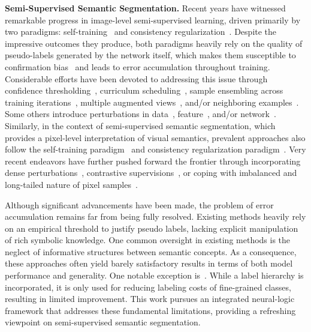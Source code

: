 \documentclass[10pt,twocolumn,letterpaper]{article}
\begin{document}
\noindent\textbf{Semi-Supervised Semantic Segmentation.}
Recent years have witnessed remarkable progress in image-level semi-supervised learning, driven primarily by two paradigms: self-training~\cite{nigam2000analyzing,grandvalet2005semi,lee2013pseudo} and consistency regularization~\cite{bachman2014learning,sajjadi2016regularization}.
Despite the impressive outcomes they produce, both paradigms heavily rely on the quality of pseudo-labels generated by the network itself, which makes them susceptible to confirmation bias~\cite{arazo2020pseudo} and leads to error accumulation throughout training.
Considerable efforts have been devoted to addressing this issue through confidence thresholding~\cite{berthelot2019remixmatch,sohn2020fixmatch,xie2020unsupervised,xie2020self}, curriculum scheduling~\cite{zhang2021flexmatch,xu2021dash}, sample ensembling across training iterations~\cite{laine2016temporal,tarvainen2017mean}, multiple augmented views~\cite{berthelot2019mixmatch}, and/or neighboring examples~\cite{iscen2019label,shi2018transductive,li2021comatch}. Some others introduce perturbations in data~\cite{xie2020unsupervised,sohn2020fixmatch,xie2020self}, feature~\cite{kuo2020featmatch}, and/or network~\cite{rasmus2015semi,sajjadi2016regularization}.
Similarly, in the context of semi-supervised semantic segmentation, which provides a pixel-level interpretation of visual semantics, prevalent approaches also follow the self-training paradigm~\cite{feng2022semi,yuan2021simple,yang2021st++,zhai2019s4l} and consistency regularization paradigm~\cite{french2020semi,ke2020guided,zou2020pseudoseg,ouali2020semi,kim2020structured,lai2021semi}. Very recent endeavors have further pushed forward the frontier through incorporating dense perturbations~\cite{yuan2022semi,yang2021st++,tu2022guidedmix,liu2022perturbed,zou2020pseudoseg}, contrastive supervisions~\cite{wang2022semi,liu2021bootstrapping,zhong2021pixel,zhou2021c3}, or coping with imbalanced and long-tailed nature of pixel samples~\cite{fan2022ucc,hu2021semi}.

Although significant advancements have been made, the problem of error accumulation remains far from being fully resolved. Existing methods heavily rely on an empirical threshold to justify pseudo labels, lacking explicit manipulation of rich symbolic knowledge. One common oversight in existing methods is the neglect of informative structures between semantic concepts.
As a consequence, these approaches often yield barely satisfactory results in terms of both model performance and generality.
One notable exception is~\cite{garg2022hiermatch}. While a label hierarchy is incorporated, it is only used for reducing labeling costs of fine-grained classes, resulting in limited improvement.
This work pursues an integrated neural-logic framework that addresses these fundamental limitations, providing a refreshing viewpoint on semi-supervised semantic segmentation.
\end{document}
